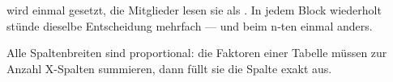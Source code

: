 \begin{defbox}
   wird einmal gesetzt, die Mitglieder lesen sie als
  . In jedem Block wiederholt stünde dieselbe
  Entscheidung mehrfach — und beim n-ten einmal anders.
\end{defbox}

\begin{runintext}
  Alle Spaltenbreiten sind proportional: die Faktoren einer Tabelle müssen
  zur Anzahl X-Spalten summieren, dann füllt sie die Spalte exakt aus.
\end{runintext}

